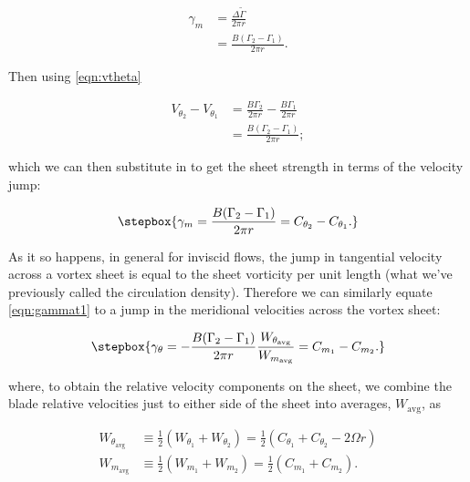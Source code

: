 \begin{equation}
    \begin{aligned}
        \gamma_m &= \frac{\Delta \widetilde{\Gamma}}{2 \pi r} \\
                 &= \frac{B(\Gamma_2-\Gamma_1)}{2 \pi r}.
    \end{aligned}
\end{equation}

\noindent Then using \cref{eqn:vtheta}

\begin{equation}
    \label{eqn:gamma2pre}
    \begin{aligned}
        V_{\theta_2} - V_{\theta_1} &= \frac{B\Gamma_2}{2 \pi r}  - \frac{B\Gamma_1}{2 \pi r} \\
        &= \frac{B(\Gamma_2 - \Gamma_1)}{2 \pi r} ;
    \end{aligned}
\end{equation}

\noindent which we can then substitute in to get the sheet strength in terms of the velocity jump:

\begin{equation}
    \label{eqn:gammam2}
    \stepbox{
    \gamma_m  = \frac{B(\Gamma_2-\Gamma_1)}{2 \pi r} = C_{\theta_2} - C_{\theta_1}.
}
\end{equation}

As it so happens, in general for inviscid flows, the jump in tangential velocity across a vortex sheet is equal to the sheet vorticity per unit length (what we've previously called the circulation density).
%
Therefore we can similarly equate \cref{eqn:gammat1} to a jump in the meridional velocities across the vortex sheet:

\begin{equation}
    \label{eqn:gammat2}
    \stepbox{
    \gamma_\theta  = -\frac{B(\Gamma_2 - \Gamma_1)}{2 \pi r} \frac{W_{\theta_\text{avg}}}{W_{m_\text{avg}}} = C_{m_1} - C_{m_2}.
}
\end{equation}

\noindent where, to obtain the relative velocity components on the sheet, we combine the blade relative velocities just to either side of the sheet into averages, \(W_\text{avg}\),  as

\begin{align}
    \label{eqn:wt}
    W_{\theta_\text{avg}} &\equiv \frac{1}{2} (W_{\theta_1} + W_{\theta_2}) = \frac{1}{2} (C_{\theta_1} + C_{\theta_2} - 2\Omega r)  \\
    \label{eqn:wm}
    W_{m_\text{avg}} &\equiv \frac{1}{2} (W_{m_1} + W_{m_2}) = \frac{1}{2} (C_{m_1} + C_{m_2}).
\end{align}


